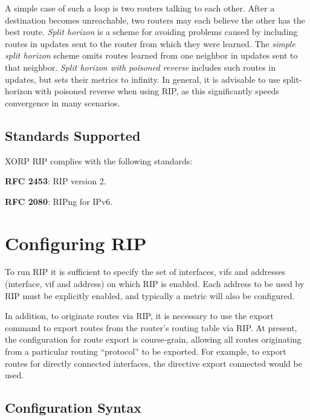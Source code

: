 A simple case of such a loop is two routers talking to each other.
After a destination becomes unreachable, two routers may each believe
the other has the best route.  {\it Split horizon} is a scheme for
avoiding problems caused by including routes in updates sent to the
router from which they were learned.  The {\it simple split horizon}
scheme omits routes learned from one neighbor in updates sent to that
neighbor.  {\it Split horizon with poisoned reverse} includes such
routes in updates, but sets their metrics to infinity.  In general, it
is advisable to use split-horizon with poisoned reverse when using
RIP, as this significantly speeds convergence in many scenarios.

\subsection{Standards Supported}

XORP RIP complies with the following standards:
\begin{description}
\item{\bf RFC 2453}: RIP version 2.
\item{\bf RFC 2080}: RIPng for IPv6.
\end{description} 

\newpage
\section{Configuring RIP}

To run RIP it is sufficient to specify the set of interfaces, vifs and
addresses ({\stt interface}, {\stt vif} and {\stt address}) on which
RIP is enabled.  Each {\stt address} to be used by RIP must be
explicitly enabled, and typically a metric will also be configured.

In addition, to originate routes via RIP, it is necessary to use the
{\stt export} command to export routes from the router's routing table
via RIP.  At present, the configuration for route export is
course-grain, allowing all routes originating from a particular
routing ``protocol'' to be exported.  For example, to export routes
for directly connected interfaces, the directive {\stt export
connected} would be used.

\subsection{Configuration Syntax}

